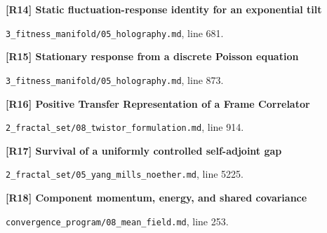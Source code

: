 \documentclass[11pt,a4paper]{article}
\begin{document}
\par\medskip\noindent\begin{minipage}{\linewidth}\textbf{[R14] Static fluctuation-response identity for an exponential tilt}\label{src:prop-fluctuation-dissipation}\par
{\small\texttt{}\par
\nolinkurl{3_fitness_manifold/05_holography.md}, line 681.\par}
\end{minipage}\par

\par\medskip\noindent\begin{minipage}{\linewidth}\textbf{[R15] Stationary response from a discrete Poisson equation}\label{src:thm-algorithmic-stationary-response}\par
{\small\texttt{}\par
\nolinkurl{3_fitness_manifold/05_holography.md}, line 873.\par}
\end{minipage}\par

\par\medskip\noindent\begin{minipage}{\linewidth}\textbf{[R16] Positive Transfer Representation of a Frame Correlator}\label{src:cor-effective-twistor-positive-transfer}\par
{\small\texttt{}\par
\nolinkurl{2_fractal_set/08_twistor_formulation.md}, line 914.\par}
\end{minipage}\par

\par\medskip\noindent\begin{minipage}{\linewidth}\textbf{[R17] Survival of a uniformly controlled self-adjoint gap}\label{src:thm-mass-gap-rg-fixed-point}\par
{\small\texttt{}\par
\nolinkurl{2_fractal_set/05_yang_mills_noether.md}, line 5225.\par}
\end{minipage}\par

\par\medskip\noindent\begin{minipage}{\linewidth}\textbf{[R18] Component momentum, energy, and shared covariance}\label{src:thm-mean-field-component-identities}\par
{\small\texttt{}\par
\nolinkurl{convergence_program/08_mean_field.md}, line 253.\par}
\end{minipage}\par
\end{document}
